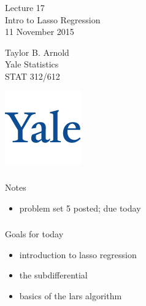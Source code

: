 



\begin{frame}[fragile] \frametitle{}

\vfill

{\fontsize{0.7cm}{0cm}\selectfont Lecture 17 \\\vspace{0.2cm}
Intro to Lasso Regression}\\\vspace{0.5cm}
11 November 2015

\vspace{2cm}

\begin{minipage}{0.6\textwidth}
Taylor B. Arnold \\
Yale Statistics \\
STAT 312/612
\end{minipage}
\hfill
\begin{minipage}{0.3\textwidth}\raggedleft
\includegraphics[scale=0.3]{../yale-logo.png}
\end{minipage}%

\end{frame}

\begin{frame}[fragile] \frametitle{}

{\color{yaleblue}\fontsize{16pt}{20pt}\selectfont Notes}

\begin{itemize}
\item problem set 5 posted; due today
\end{itemize}

\end{frame}

\begin{frame}[fragile] \frametitle{}

{\color{yaleblue}\fontsize{16pt}{20pt}\selectfont Goals for today}

\begin{itemize}
\item introduction to lasso regression
\item the subdifferential
\item basics of the lars algorithm
\end{itemize}

\end{frame}

